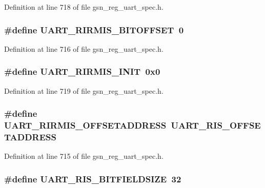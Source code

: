 Definition at line 718 of file gsn\_\-reg\_\-uart\_\-spec.h.

\hypertarget{a00575_ac9c1d0ccde6ac054addb73f80c68958d}{
\subsubsection[{UART\_\-RIRMIS\_\-BITOFFSET}]{\setlength{\rightskip}{0pt plus 5cm}\#define UART\_\-RIRMIS\_\-BITOFFSET~0}}
\label{a00575_ac9c1d0ccde6ac054addb73f80c68958d}


Definition at line 716 of file gsn\_\-reg\_\-uart\_\-spec.h.

\hypertarget{a00575_a1df17599d2535f670e4687b68ee18aaa}{
\subsubsection[{UART\_\-RIRMIS\_\-INIT}]{\setlength{\rightskip}{0pt plus 5cm}\#define UART\_\-RIRMIS\_\-INIT~0x0}}
\label{a00575_a1df17599d2535f670e4687b68ee18aaa}


Definition at line 719 of file gsn\_\-reg\_\-uart\_\-spec.h.

\hypertarget{a00575_a548ebc26f5fa42b536e65a2a01d9463d}{
\subsubsection[{UART\_\-RIRMIS\_\-OFFSETADDRESS}]{\setlength{\rightskip}{0pt plus 5cm}\#define UART\_\-RIRMIS\_\-OFFSETADDRESS~UART\_\-RIS\_\-OFFSETADDRESS}}
\label{a00575_a548ebc26f5fa42b536e65a2a01d9463d}


Definition at line 715 of file gsn\_\-reg\_\-uart\_\-spec.h.

\hypertarget{a00575_a51440eee5cfe8c151858b2808dc9a09b}{
\subsubsection[{UART\_\-RIS\_\-BITFIELDSIZE}]{\setlength{\rightskip}{0pt plus 5cm}\#define UART\_\-RIS\_\-BITFIELDSIZE~32}}
\label{a00575_a51440eee5cfe8c151858b2808dc9a09b}


